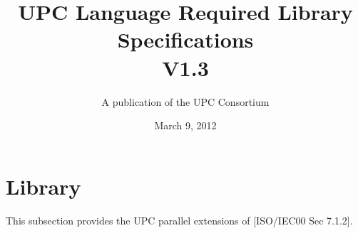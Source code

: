 

\makeindex

\title{UPC Language Required Library Specifications\\
V1.3 }

\author{A publication of the UPC Consortium}

\date {March 9, 2012}



\maketitle

\setcounter{page}{2}
\newpage
\setlength {\parskip}{0ex}
\tableofcontents                                             
\setlength {\parskip}{1.3ex}
\newpage

\setcounter{section}{6} %
\section{Library}

\npf This subsection provides the UPC parallel extensions of
    [ISO/IEC00 Sec 7.1.2].

\setcounter{subsection}{3} %


\pagebreak
\printindex

